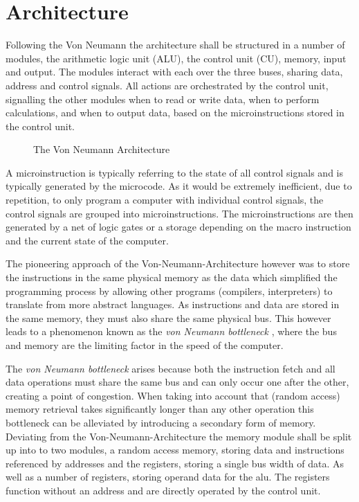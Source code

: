 \section{Architecture}

Following the Von Neumann the architecture shall be structured in a number of modules, the arithmetic logic unit (ALU), the control unit (CU), memory, input and output. The modules interact with each over the three buses, sharing data, address and control signals. All actions are orchestrated by the control unit, signalling the other modules when to read or write data, when to perform calculations, and when to output data, based on the microinstructions stored in the control unit.

\begin{figure}[H]
  \begin{center}
    
  \end{center}
  \caption{The Von Neumann Architecture \cite{fig-vna}}\label{fig:vna}
\end{figure}

A microinstruction is typically referring to the state of all control signals and is typically generated by the microcode. As it would be extremely inefficient, due to repetition, to only program a computer with individual control signals, the control signals are grouped into microinstructions. The microinstructions are then generated by a net of logic gates or a storage depending on the macro instruction and the current state of the computer.

The pioneering approach of the Von-Neumann-Architecture however was to store the instructions in the same physical memory as the data which simplified the programming process by allowing other programs (compilers, interpreters) to translate from more abstract languages. As instructions and data are stored in the same memory, they must also share the same physical bus. This however leads  to a phenomenon known as the \textit{von Neumann bottleneck} \cite{cit.needed}, where the bus and memory are the limiting factor in the speed of the computer. 

The \textit{von Neumann bottleneck} arises because both the instruction fetch and all data operations must share the same bus and can only occur one after the other, creating a point of congestion. When taking into account that (random access) memory retrieval takes significantly longer than any other operation this bottleneck can be alleviated by introducing a secondary form of memory. Deviating from the Von-Neumann-Architecture the memory module shall be split up into to two modules, a random access memory, storing data and instructions referenced by addresses and the registers, storing a single bus width of data. As well as a number of registers, storing operand data for the alu. The registers function without an address and are directly operated by the control unit.

